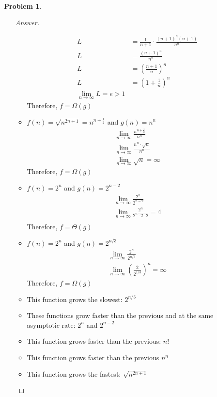 \documentclass[11pt]{article}
\theoremstyle{definition}
\theoremstyle{definition}
\newtheorem{required}{Problem}
\theoremstyle{definition}
\begin{document}
\begin{required}
\begin{enumerate}[label=(\alph*)]
\begin{proof}[Answer]
\begin{itemize}
\begin{align*}
                L &= \frac{1}{n+1} \cdot \frac{(n+1)^n(n+1)}{n^n} \\
                L &= \frac{(n+1)^n}{n^n} \\
                L &= \left(\frac{n+1}{n}\right)^n \\
                L &= \left(1+\frac{1}{n}\right)^n \\
               \lim_{n \to \infty} L = e > 1 
            \end{align*}
            Therefore, $f=\Omega (g)$
            \item $f(n) = \sqrt{n^{2n+1}} = n^{n+\frac{1}{2}}$ and $g(n) = n^n$
            \begin{align*}
                \lim_{n \to \infty} \frac{n^{n+\frac{1}{2}}}{n^n} \\
                 \lim_{n \to \infty} \frac{n^n \cdot \sqrt{n}}{n^n} \\
                 \lim_{n \to \infty} \sqrt{n} = \infty  
            \end{align*}
            Therefore, $f=\Omega(g)$ 
            \item $f(n) = 2^n$ and $g(n) = 2^{n-2}$
            \begin{align*}
                \lim_{n \to \infty} \frac{2^n}{2^{n-2}} \\
                 \lim_{n \to \infty} \frac{2^n}{2^n \cdot 2^-2} = 4 \\
            \end{align*}
            Therefore, $f=\Theta(g)$
            \item $f(n) = 2^n$ and $g(n) = 2^{n/3}$
            \begin{align*}
                 \lim_{n \to \infty} \frac{2^n}{2^{n/3}} \\
                 \lim_{n \to \infty} \left(\frac{2}{2^{1/3}}\right)^n = \infty 
            \end{align*}
            Therefore, $f = \Omega(g)$
        \end{itemize}
            \begin{itemize}
            \item This function grows the slowest: $2^{n/3}$
            \item These functions grow faster than the previous and at the same asymptotic rate: $2^n$ and $2^{n-2}$
            \item This function grows faster than the previous: $n!$
            \item This function grows faster than the previous $n^n$
            \item This function grows the fastest: $\sqrt{n^{2n+1}}$
            \end{itemize}
        \end{proof}
\end{enumerate}

\end{required}
\end{document}
